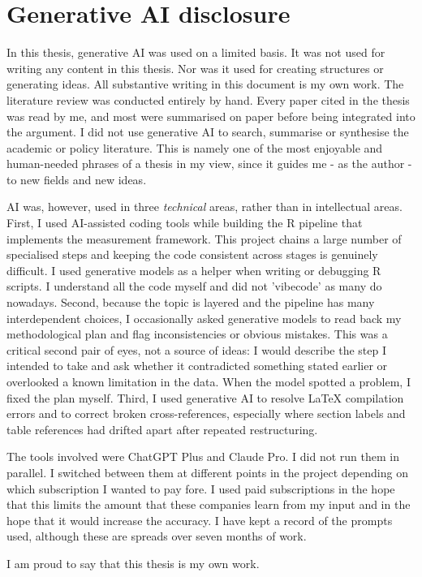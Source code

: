 \documentclass[11pt,a4paper]{article}
\begin{document}



\newpage

\section{Generative AI disclosure}\label{app:ai_disclosure}

In this thesis, generative AI was used on a limited basis. It was not used for writing any content in this thesis. Nor was it used for creating structures or generating ideas. All substantive writing in this document is my own work. The literature review was conducted entirely by hand. Every paper cited in the thesis was read by me, and most were summarised on paper before being integrated into the argument. I did not use generative AI to search, summarise or synthesise the academic or policy literature. This is namely one of the most enjoyable and human-needed phrases of a thesis in my view, since it guides me - as the author - to new fields and new ideas. 

AI was, however, used in three \emph{technical} areas, rather than in intellectual areas. First, I used AI-assisted coding tools while building the R pipeline that implements the measurement framework. This project chains a large number of specialised steps and keeping the code consistent across stages is genuinely difficult. I used generative models as a helper when writing or debugging R scripts. I understand all the code myself and did not 'vibecode' as many do nowadays. Second, because the topic is layered and the pipeline has many interdependent choices, I occasionally asked generative models to read back my methodological plan and flag inconsistencies or obvious mistakes. This was a critical second pair of eyes, not a source of ideas: I would describe the step I intended to take and ask whether it contradicted something stated earlier or overlooked a known limitation in the data. When the model spotted a problem, I fixed the plan myself. Third, I used generative AI to resolve LaTeX compilation errors and to correct broken cross-references, especially where section labels and table references had drifted apart after repeated restructuring.

The tools involved were ChatGPT Plus and Claude Pro. I did not run them in parallel. I switched between them at different points in the project depending on which subscription I wanted to pay fore. I used paid subscriptions in the hope that this limits the amount that these companies learn from my input and in the hope that it would increase the accuracy. I have kept a record of the prompts used, although these are spreads over seven months of work. 

I am proud to say that this thesis is my own work. 
\end{document}
